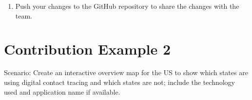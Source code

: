\documentclass[
]{book}
\providecommand{\tightlist}{%
  \setlength{\itemsep}{0pt}\setlength{\parskip}{0pt}}
\begin{document}
\begin{enumerate}
\def\labelenumi{\arabic{enumi}.}
\setcounter{enumi}{6}
\tightlist
\item
  Push your changes to the GitHub repository to share the changes with the team.
\end{enumerate}

\hypertarget{contribution-example-2}{%
\section{Contribution Example 2}\label{contribution-example-2}}

Scenario: Create an interactive overview map for the US to show which states are using digital contact tracing and which states are not; include the technology used and application name if available.
\end{document}
